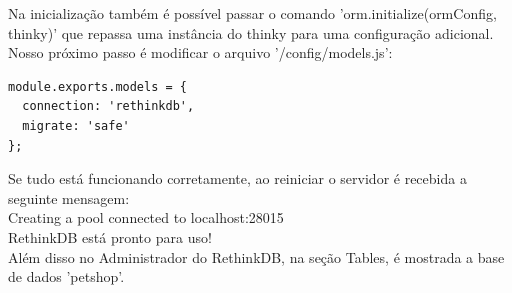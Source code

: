 \documentclass[a4paper,11pt]{article}
\begin{document}
Na inicialização também é possível passar o comando 'orm.initialize(ormConfig, thinky)' que repassa uma instância do thinky para uma configuração adicional. Nosso próximo passo é modificar o arquivo '/config/models.js':
\begin{lstlisting}
module.exports.models = {
  connection: 'rethinkdb',
  migrate: 'safe'
};  
\end{lstlisting}
Se tudo está funcionando corretamente, ao reiniciar o servidor é recebida a seguinte mensagem: \\[3mm]
{\ttfamily Creating a pool connected to localhost:28015} \\[1mm]
{\ttfamily RethinkDB está pronto para uso!} \\[1mm]
Além disso no Administrador do RethinkDB, na seção Tables, é mostrada a base de 
dados 'petshop'.
\end{document}
